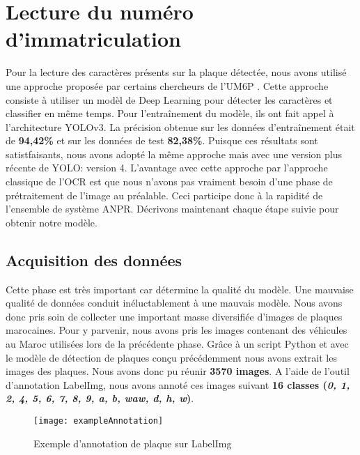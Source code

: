 \section{Lecture du numéro d'immatriculation}
Pour la lecture des caractères présents sur la plaque détectée, nous avons utilisé une approche proposée par certains chercheurs de l’UM6P \cite{Alahyane2021OpenDF}. Cette approche consiste à utiliser un modèl de Deep Learning pour détecter les caractères et classifier en même temps. Pour l’entraînement du modèle, ils ont fait appel à l’architecture YOLOv3. La précision obtenue sur les données d’entraînement était de \textbf{94,42\%} et sur les données de test \textbf{82,38\%}. Puisque ces résultats sont satistfaisants, nous avons adopté la même approche mais avec une version plus récente de YOLO: version 4. L'avantage avec cette approche par l'approche classique de l'OCR est que nous n'avons pas vraiment besoin d'une phase de prétraitement de l'image au préalable. Ceci participe donc à la rapidité de l'ensemble de système ANPR. Décrivons maintenant chaque étape suivie pour obtenir notre modèle.
    \subsection{Acquisition des données}
    Cette phase est très important car détermine la qualité du modèle. Une mauvaise qualité de données conduit inéluctablement à une mauvais modèle. Nous avons donc pris soin de collecter une important masse diversifiée d’images de plaques marocaines. Pour y parvenir, nous avons pris les images contenant des véhicules au Maroc utilisées lors de la précédente phase. Grâce à un script Python et avec le modèle de détection de plaques conçu précédemment nous avons extrait les images des plaques. Nous avons donc pu réunir \textbf{3570 images}. A l’aide de l’outil d’annotation LabelImg, nous avons annoté ces images suivant \textbf{16 classes (\textit{0, 1, 2, 4, 5, 6, 7, 8, 9, a, b, waw, d, h, w})}.
    \begin{figure}[H]
        \centering
        \texttt{[image: exampleAnnotation]}
        \caption{Exemple d'annotation de plaque sur LabelImg}
    \end{figure}
